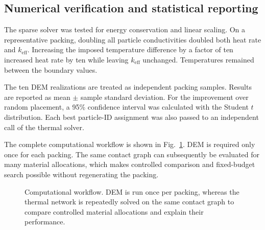 \documentclass[12pt,a4paper]{article}
\begin{document}
	\subsection{Numerical verification and statistical reporting}
	
	The sparse solver was tested for energy conservation and linear scaling. On a
	representative packing, doubling all particle conductivities doubled both heat
	rate and $k_{\mathrm{eff}}$. Increasing the imposed temperature difference by
	a factor of ten increased heat rate by ten while leaving $k_{\mathrm{eff}}$
	unchanged. Temperatures remained between the boundary values.
	
	The ten DEM realizations are treated as independent packing samples. Results
	are reported as mean $\pm$ sample standard deviation. For the improvement over
	random placement, a 95\% confidence interval was calculated with the Student
	$t$ distribution. Each best particle-ID assignment was also passed to an
	independent call of the thermal solver.
	
	The complete computational workflow is shown in Fig.~\ref{fig:workflow}. DEM is
	required only once for each packing. The same contact graph can subsequently be
	evaluated for many material allocations, which makes controlled comparison and
	fixed-budget search possible without regenerating the packing.
	
	\begin{figure}[!htbp]
		\centering
		\caption{Computational workflow. DEM is run once per packing, whereas the
			thermal network is repeatedly solved on the same contact graph to compare
			controlled material allocations and explain their performance.}
		\label{fig:workflow}
	\end{figure}
	
\end{document}
